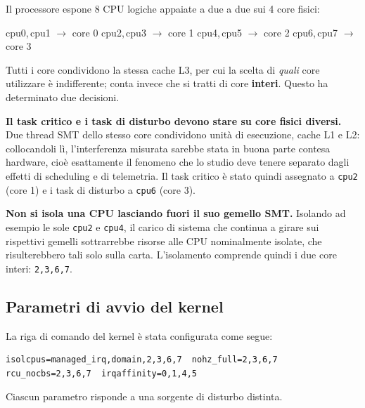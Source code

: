 \documentclass[11pt,a4paper]{article}
\begin{document}
Il processore espone 8 CPU logiche appaiate a due a due sui 4 core fisici:

\begin{center}\ttfamily\small
cpu0,\,cpu1 $\rightarrow$ core 0 \quad
cpu2,\,cpu3 $\rightarrow$ core 1 \quad
cpu4,\,cpu5 $\rightarrow$ core 2 \quad
cpu6,\,cpu7 $\rightarrow$ core 3
\end{center}

Tutti i core condividono la stessa cache L3, per cui la scelta di \emph{quali} core utilizzare \`e
indifferente; conta invece che si tratti di core \textbf{interi}. Questo ha determinato due
decisioni.

\textbf{Il task critico e i task di disturbo devono stare su core fisici diversi.} Due thread SMT
dello stesso core condividono unit\`a di esecuzione, cache L1 e L2: collocandoli l\`i,
l'interferenza misurata sarebbe stata in buona parte contesa hardware, cio\`e esattamente il
fenomeno che lo studio deve tenere separato dagli effetti di scheduling e di telemetria. Il task
critico \`e stato quindi assegnato a \texttt{cpu2} (core 1) e i task di disturbo a \texttt{cpu6}
(core 3).

\textbf{Non si isola una CPU lasciando fuori il suo gemello SMT.} Isolando ad esempio le sole
\texttt{cpu2} e \texttt{cpu4}, il carico di sistema che continua a girare sui rispettivi gemelli
sottrarrebbe risorse alle CPU nominalmente isolate, che risulterebbero tali solo sulla carta.
L'isolamento comprende quindi i due core interi: \texttt{2,3,6,7}.

\subsection{Parametri di avvio del kernel}

La riga di comando del kernel \`e stata configurata come segue:

\begin{lstlisting}
isolcpus=managed_irq,domain,2,3,6,7  nohz_full=2,3,6,7
rcu_nocbs=2,3,6,7  irqaffinity=0,1,4,5
\end{lstlisting}

Ciascun parametro risponde a una sorgente di disturbo distinta.
\end{document}
